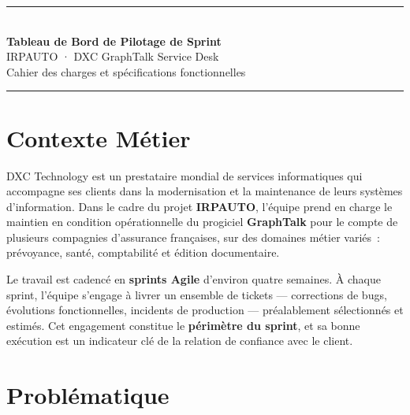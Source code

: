 \documentclass[12pt, a4paper]{article}
\begin{document}
\begin{center}
  {\color{dxcpurple}\rule{\linewidth}{1.5pt}}\\[0.5cm]
  {\LARGE\bfseries\color{dxcpurple}
    Tableau de Bord de Pilotage de Sprint}\\[0.25cm]
  {\large IRPAUTO · DXC GraphTalk Service Desk}\\[0.15cm]
  {\normalsize\color{greytext}
    Cahier des charges et spécifications fonctionnelles}\\[0.4cm]
  {\color{dxcpurple}\rule{\linewidth}{1.5pt}}
\end{center}

\vspace{0.6cm}

\section{Contexte Métier}

DXC Technology est un prestataire mondial de services informatiques qui accompagne ses
clients dans la modernisation et la maintenance de leurs systèmes d'information. Dans
le cadre du projet \textbf{IRPAUTO}, l'équipe prend en charge le maintien en condition
opérationnelle du progiciel \textbf{GraphTalk} pour le compte de plusieurs compagnies
d'assurance françaises, sur des domaines métier variés~: prévoyance, santé, comptabilité
et édition documentaire.

\vspace{0.2cm}

Le travail est cadencé en \textbf{sprints Agile} d'environ quatre semaines. À chaque
sprint, l'équipe s'engage à livrer un ensemble de tickets — corrections de bugs,
évolutions fonctionnelles, incidents de production — préalablement sélectionnés et
estimés. Cet engagement constitue le \textbf{périmètre du sprint}, et sa bonne
exécution est un indicateur clé de la relation de confiance avec le client.

\vspace{0.4cm}

\section{Problématique}
\end{document}
